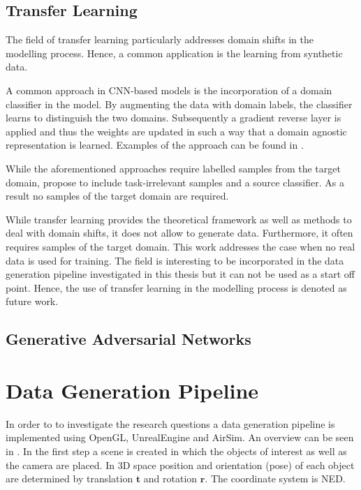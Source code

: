 \subsection{Transfer Learning}

The field of transfer learning particularly addresses domain shifts in the modelling process. Hence, a common application is the learning from synthetic data.

A common approach in \ac{CNN}-based models is the incorporation of a domain classifier in the model. By augmenting the data with domain labels, the classifier learns to distinguish the two domains. Subsequently a gradient reverse layer is applied and thus the weights are updated in such a way that a domain agnostic representation is learned. Examples of the approach can be found in \cite{Chen2018c} \cite{Xu2017}.

While the aforementioned approaches require labelled samples from the target domain, \citeauthor{Peng2017} \cite{Peng2017} propose to include task-irrelevant samples and a source classifier. As a result no samples of the target domain are required.

While transfer learning provides the theoretical framework as well as methods to deal with domain shifts, it does not allow to generate data. Furthermore, it often requires samples of the target domain. This work addresses the case when no real data is used for training. The field is interesting to be incorporated in the data generation pipeline investigated in this thesis but it can not be used as a start off point. Hence, the use of transfer learning in the modelling process is denoted as future work.

\subsection{Generative Adversarial Networks}

\cite{Inoue} 

\section{Data Generation Pipeline}

In order to to investigate the research questions a data generation pipeline is implemented using OpenGL, UnrealEngine and AirSim. An overview can be seen in . In the first step a scene is created in which the objects of interest as well as the camera are placed. In 3D space position and orientation (pose) of each object are determined by translation $\textbf{t}$ and rotation $\textbf{r}$. The coordinate system is \ac{NED}.

